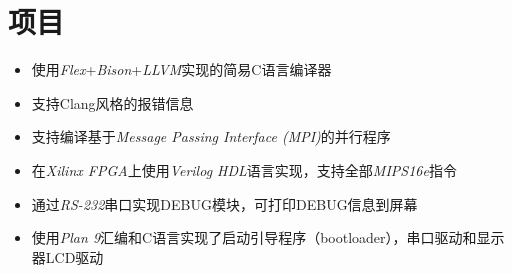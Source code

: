 \documentclass[11pt,a4paper,roman]{moderncv} %
\begin{document}
\section{项目}

{
	\begin{itemize}
		\item 使用\emph{Flex}+\emph{Bison}+\emph{LLVM}实现的简易C语言编译器
		\item 支持Clang风格的报错信息
		\item 支持编译基于\textit{Message Passing Interface (MPI)}的并行程序
	\end{itemize}
}

{
	\begin{itemize}
    \item 在\emph{Xilinx FPGA}上使用\emph{Verilog HDL}语言实现，支持全部\emph{MIPS16e}指令
		\item 通过\emph{RS-232}串口实现DEBUG模块，可打印DEBUG信息到屏幕 
	\end{itemize}
}

{
	\begin{itemize}
		\item 使用\emph{Plan 9}汇编和C语言实现了启动引导程序（bootloader），串口驱动和显示器LCD驱动
	\end{itemize}
}


%
\end{document}
